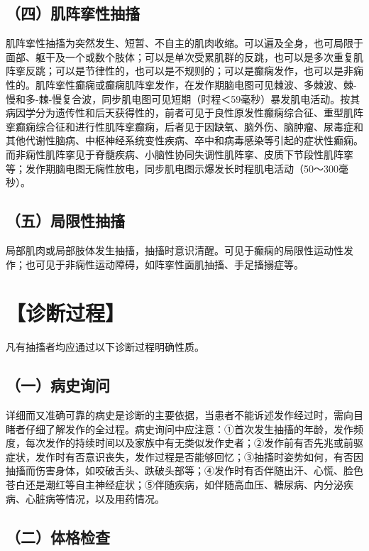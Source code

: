 \subsection{（四）肌阵挛性抽搐}

肌阵挛性抽搐为突然发生、短暂、不自主的肌肉收缩。可以遍及全身，也可局限于面部、躯干及一个或数个肢体；可以是单次受累肌群的反跳，也可以是多次重复肌阵挛反跳；可以是节律性的，也可以是不规则的；可以是癫痫发作，也可以是非痫性的。肌阵挛性癫痫或癫痫肌阵挛发作，在发作期脑电图可见棘波、多棘波、棘-慢和多-棘-慢复合波，同步肌电图可见短期（时程＜59毫秒）暴发肌电活动。按其病因学分为遗传性和后天获得性的，前者可见于良性原发性癫痫综合征、重型肌阵挛癫痫综合征和进行性肌阵挛癫痫，后者见于因缺氧、脑外伤、脑肿瘤、尿毒症和其他代谢性脑病、中枢神经系统变性疾病、卒中和病毒感染等引起的症状性癫痫。而非痫性肌阵挛见于脊髓疾病、小脑性协同失调性肌阵挛、皮质下节段性肌阵挛等；发作期脑电图无痫性放电，同步肌电图示爆发长时程肌电活动（50～300毫秒）。

\subsection{（五）局限性抽搐}

局部肌肉或局部肢体发生抽搐，抽搐时意识清醒。可见于癫痫的局限性运动性发作；也可见于非痫性运动障碍，如阵挛性面肌抽搐、手足搐搦症等。

\section{【诊断过程】}

凡有抽搐者均应通过以下诊断过程明确性质。

\subsection{（一）病史询问}

详细而又准确可靠的病史是诊断的主要依据，当患者不能诉述发作经过时，需向目睹者仔细了解发作的全过程。病史询问中应注意：①首次发生抽搐的年龄，发作频度，每次发作的持续时间以及家族中有无类似发作史者；②发作前有否先兆或前驱症状，发作时有否意识丧失，发作过程是否能够回忆；③抽搐时姿势如何，有否因抽搐而伤害身体，如咬破舌头、跌破头部等；④发作时有否伴随出汗、心慌、脸色苍白还是潮红等自主神经症状；⑤伴随疾病，如伴随高血压、糖尿病、内分泌疾病、心脏病等情况，以及用药情况。

\subsection{（二）体格检查}

